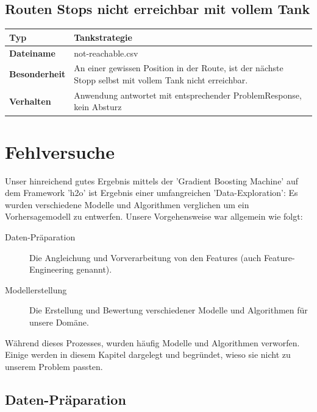 \documentclass[
ngerman          %
,a4paper          %
,11pt
,pdftex
]{report}
\begin{document}
\subsection{Routen Stops nicht erreichbar mit vollem Tank}

\begin{table}[H]
	\centering
	\begin{tabular}{l p{12cm}}
		\textbf{Typ} & \textbf{Tankstrategie} \\ 
		\hline
		\hline
		\textbf{Dateiname} & not-reachable.csv \\
        \textbf{Besonderheit} & An einer gewissen Position in der Route, ist der nächste Stopp selbst mit vollem Tank nicht erreichbar. \\
        \textbf{Verhalten} & Anwendung antwortet mit entsprechender ProblemResponse, kein Absturz \\
		\hline 
	\end{tabular}
\end{table} 
\section{Fehlversuche}

Unser hinreichend gutes Ergebnis mittels der 'Gradient Boosting Machine' auf dem Framework 'h2o' ist Ergebnis einer umfangreichen 'Data-Exploration': Es wurden verschiedene Modelle und Algorithmen verglichen um ein Vorhersagemodell zu entwerfen. Unsere Vorgehensweise war allgemein wie folgt:

\begin{description}
	\item[Daten-Präparation]
Die Angleichung und Vorverarbeitung von den Features (auch Feature-Engineering genannt).
	\item[Modellerstellung] 
	Die Erstellung und Bewertung verschiedener Modelle und Algorithmen für unsere Domäne.
\end{description}

Während dieses Prozesses, wurden häufig Modelle und Algorithmen verworfen. Einige werden in diesem Kapitel dargelegt und begründet, wieso sie nicht zu unserem Problem passten.

\subsection{Daten-Präparation}
\end{document}
